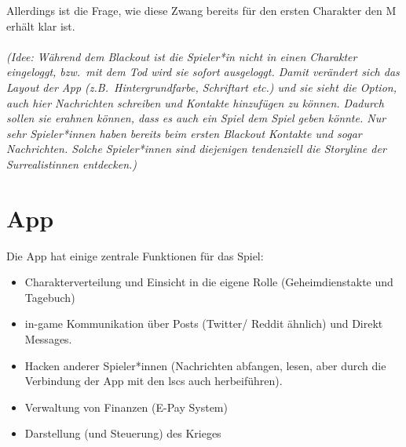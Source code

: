 Allerdings ist die Frage, wie diese Zwang bereits für den ersten Charakter den M
erhält klar ist.\\\\
%
\emph{(Idee: Während dem Blackout ist die Spieler*in nicht in einen Charakter
eingeloggt, bzw.~mit dem Tod wird sie sofort ausgeloggt. Damit verändert sich
das Layout der App (z.B.~Hintergrundfarbe, Schriftart etc.) und sie sieht 
die Option, auch hier Nachrichten schreiben und Kontakte hinzufügen zu können. 
Dadurch sollen sie erahnen können, dass es auch ein Spiel  dem Spiel
geben könnte. Nur sehr Spieler*innen haben bereits beim ersten Blackout Kontakte
und sogar Nachrichten. Solche Spieler*innen sind diejenigen tendenziell die
Storyline der Surrealistinnen entdecken.)}

\section{App} 
Die App hat einige zentrale Funktionen für das Spiel:
\begin{itemize}
  \item Charakterverteilung und Einsicht in die eigene Rolle (Geheimdienstakte
    und Tagebuch)
  \item in-game Kommunikation über Posts (Twitter/ Reddit ähnlich) und Direkt
    Messages. 
  \item Hacken anderer Spieler*innen (Nachrichten abfangen, lesen, aber durch
    die Verbindung der App mit den \ac{lsc}s auch 
    herbeiführen).
  \item Verwaltung von Finanzen (E-Pay System)
  \item Darstellung (und Steuerung) des Krieges
\end{itemize}

